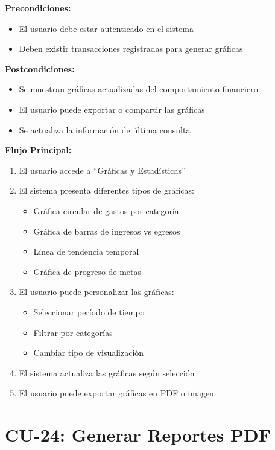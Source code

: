 \noindent\textbf{Precondiciones:}
\begin{itemize}
    \item El usuario debe estar autenticado en el sistema
    \item Deben existir transacciones registradas para generar gráficas
\end{itemize}

\noindent\textbf{Postcondiciones:}
\begin{itemize}
    \item Se muestran gráficas actualizadas del comportamiento financiero
    \item El usuario puede exportar o compartir las gráficas
    \item Se actualiza la información de última consulta
\end{itemize}

\noindent\textbf{Flujo Principal:}
\begin{enumerate}
    \item El usuario accede a ``Gráficas y Estadísticas''
    \item El sistema presenta diferentes tipos de gráficas:
    \begin{itemize}
        \item Gráfica circular de gastos por categoría
        \item Gráfica de barras de ingresos vs egresos
        \item Línea de tendencia temporal
        \item Gráfica de progreso de metas
    \end{itemize}
    \item El usuario puede personalizar las gráficas:
    \begin{itemize}
        \item Seleccionar período de tiempo
        \item Filtrar por categorías
        \item Cambiar tipo de visualización
    \end{itemize}
    \item El sistema actualiza las gráficas según selección
    \item El usuario puede exportar gráficas en PDF o imagen
\end{enumerate}

\section{CU-24: Generar Reportes PDF}

